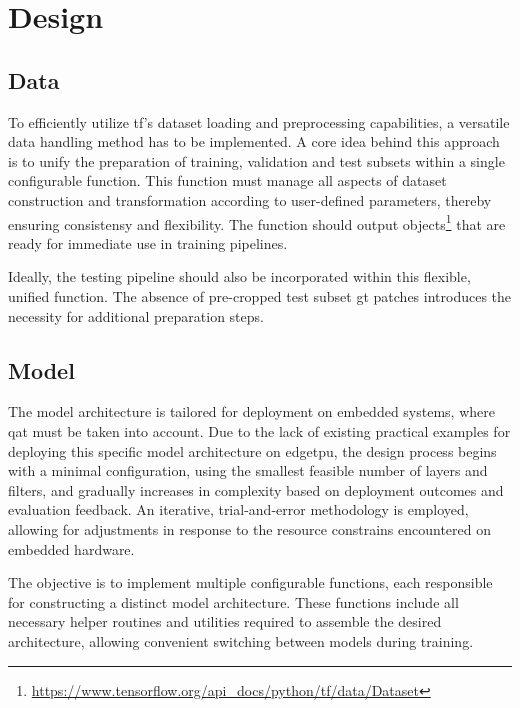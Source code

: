 {\section{Design}

\subsection*{Data}

To efficiently utilize \gls{tf}'s dataset loading and preprocessing capabilities, a versatile data handling method has to be implemented.
A core idea behind this approach is to unify the preparation of training, validation and test subsets within a single configurable function.
This function must manage all aspects of dataset construction and transformation according to user-defined parameters, thereby ensuring consistensy and flexibility.
The function should output  objects\footnote{\url{https://www.tensorflow.org/api_docs/python/tf/data/Dataset}} that are ready for immediate use in training pipelines.

Ideally, the testing pipeline should also be incorporated within this flexible, unified function.
The absence of pre-cropped test subset \gls{gt} patches introduces the necessity for additional preparation steps.

\subsection*{Model}

The model architecture is tailored for deployment on embedded systems, where \gls{qat} must be taken into account.
Due to the lack of existing practical examples for deploying this specific model architecture on \gls{edgetpu},
the design process begins with a minimal configuration, using the smallest feasible number of layers and filters,
and gradually increases in complexity based on deployment outcomes and evaluation feedback.
An iterative, trial-and-error methodology is employed, allowing for adjustments in response to the resource constrains encountered on embedded hardware.

The objective is to implement multiple configurable functions, each responsible for constructing a distinct model architecture.
These functions include all necessary helper routines and utilities required to assemble the desired architecture,
allowing convenient switching between models during training.

}
